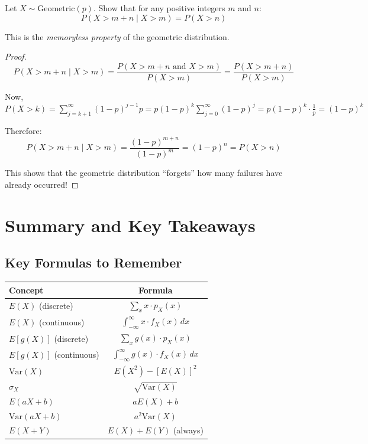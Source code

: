 \begin{exercise}
Let \(X \sim \text{Geometric}(p)\). Show that for any positive integers \(m\) and \(n\):
\[
P(X > m+n \mid X > m) = P(X > n)
\]

This is the \emph{memoryless property} of the geometric distribution.
\end{exercise}

\begin{proof}
\[
P(X > m+n \mid X > m) = \frac{P(X > m+n \text{ and } X > m)}{P(X > m)} = \frac{P(X > m+n)}{P(X > m)}
\]

Now, \(P(X > k) = \sum_{j=k+1}^{\infty} (1-p)^{j-1} p = p(1-p)^k \sum_{j=0}^{\infty} (1-p)^j = p(1-p)^k \cdot \frac{1}{p} = (1-p)^k\)

Therefore:
\[
P(X > m+n \mid X > m) = \frac{(1-p)^{m+n}}{(1-p)^m} = (1-p)^n = P(X > n)
\]

This shows that the geometric distribution ``forgets'' how many failures have already occurred!
\end{proof}

\newpage

\section{Summary and Key Takeaways}

\subsection{Key Formulas to Remember}

\begin{center}
\renewcommand{\arraystretch}{1.5}
\begin{tabular}{|l|c|}
\hline
\textbf{Concept} & \textbf{Formula} \\ \hline
\hline
\(E(X)\) (discrete) & \(\sum_{x} x \cdot p_X(x)\) \\ \hline
\(E(X)\) (continuous) & \(\int_{-\infty}^{\infty} x \cdot f_X(x) \, dx\) \\ \hline
\(E[g(X)]\) (discrete) & \(\sum_{x} g(x) \cdot p_X(x)\) \\ \hline
\(E[g(X)]\) (continuous) & \(\int_{-\infty}^{\infty} g(x) \cdot f_X(x) \, dx\) \\ \hline
\(\text{Var}(X)\) & \(E(X^2) - [E(X)]^2\) \\ \hline
\(\sigma_X\) & \(\sqrt{\text{Var}(X)}\) \\ \hline
\(E(aX + b)\) & \(aE(X) + b\) \\ \hline
\(\text{Var}(aX + b)\) & \(a^2 \text{Var}(X)\) \\ \hline
\(E(X + Y)\) & \(E(X) + E(Y)\) (always) \\ \hline
\end{tabular}
\end{center}

